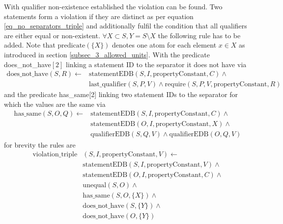 \documentclass[hyperref,bachelorofscience,fleqn]{cgvpub}
\begin{document}
With qualifier non-existence established the violation can be found. Two statements form a violation if they are distinct as per equation \ref{eq_no_separators_triple} and additionally fulfil the condition that all qualifiers are either equal or non-existent. \(\forall X \subset S, Y = S \setminus X\) the following rule has to be added. Note that \(\text{predicate}(\{X\})\) denotes one atom for each element \(x \in X\) as introduced in section \ref{subsec_3_allowed_units}. With the predicate does\_not\_have\([2]\) linking a statement ID to the separator it does not have via 
\begin{equation*}
\begin{split}
\text{does\_not\_have}(S, R) \leftarrow &\text{statementEDB}(S, I, \text{propertyConstant}, C) \wedge{} \\
&\text{last\_qualifier}(S, P, V) \wedge \text{require}(S, P, V, \text{propertyConstant}, R)
\end{split}
\end{equation*}
and the predicate has\_same[2] linking two statement IDs to the separator for which the values are the same via
\begin{equation*}
\begin{split}
\text{has\_same}(S, O, Q) \leftarrow &\text{statementEDB}(S, I, \text{propertyConstant}, C) \wedge{} \\
&\text{statementEDB}(O, I, \text{propertyConstant}, X) \wedge{} \\
&\text{qualifierEDB}(S, Q, V) \wedge \text{qualifierEDB}(O, Q, V)
\end{split}
\end{equation*}
 for brevity the rules are
\begin{equation*}
\begin{split}
\text{violation\_triple}&(S, I, \text{propertyConstant}, V) \leftarrow \\
&\text{statementEDB}(S, I, \text{propertyConstant}, V) \wedge{} \\
&\text{statementEDB}(O, I, \text{propertyConstant}, C) \wedge{} \\
&\text{unequal}(S, O) \wedge{} \\
&\text{has\_same}(S, O, \{X\}) \wedge{} \\
&\text{does\_not\_have}(S, \{Y\}) \wedge{} \\
&\text{does\_not\_have}(O, \{Y\})
\end{split}
\end{equation*}
\end{document}
